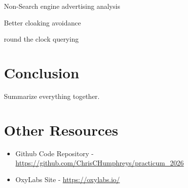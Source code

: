 \documentclass[sigconf]{acmart}
\begin{document}
Non-Search engine advertising analysis

Better cloaking avoidance

round the clock querying

\section{Conclusion}
\label{sec:conclusion}
Summarize everything together.





\appendix

\section{Other Resources}
\begin{itemize}
\item Github Code Repository -
  \url{https://github.com/ChrisCHumphreys/practicum_2026}
  \item OxyLabs Site - \url{https://oxylabs.io/}
\end{itemize}






\end{document}
